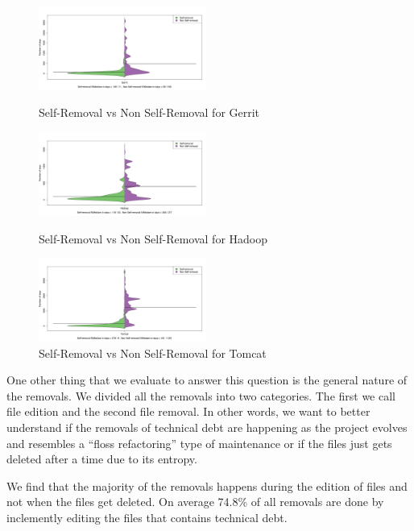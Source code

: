 \begin{figure}[thb!]
  \centering
  \includegraphics[width=0.49\textwidth]{figures/gerrit_beanplot.pdf}
  \caption{Self-Removal vs Non Self-Removal for Gerrit}
  \label{fig:removal_comparison_gerrit}
  \includegraphics[width=0.49\textwidth]{figures/hadoop_beanplot.pdf}
  \caption{Self-Removal vs Non Self-Removal for Hadoop}
  \label{fig:removal_comparison_hadoop}
  \includegraphics[width=0.49\textwidth]{figures/tomcat_beanplot.pdf}
  \caption{Self-Removal vs Non Self-Removal for Tomcat}
  \label{fig:removal_comparison_tomcat} 
\end{figure}

One other thing that we evaluate to answer this question is the general nature of the removals. We divided all the removals into two categories. The first we call file edition and the second file removal. In other words, we want to better understand if the removals of technical debt are happening as the project evolves and resembles a ``floss refactoring'' type of maintenance or if the files just gets deleted after a time due to its entropy. 

We find that the majority of the removals happens during the edition of files and not when the files get deleted. On average 74.8\% of all removals are done by inclemently editing the files that contains technical debt.




